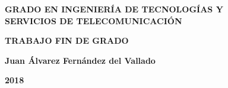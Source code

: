\pagestyle{empty}

\vspace*{5.5cm}

\begin{center}

{\Large\rm \textbf{ GRADO EN INGENIERÍA DE TECNOLOGÍAS Y\\
SERVICIOS DE TELECOMUNICACIÓN\\}}

\vspace{1.0cm}

{\Large\rm \textbf{TRABAJO FIN DE GRADO}}

\vspace{2cm}

{\Large\rm\textbf{\tfgtitle}}

\vspace*{\fill}

{\Large\rm\textbf{Juan Álvarez Fernández del Vallado}}

{\Large \textbf{2018}}
\vspace{1.0cm}
\end{center}

